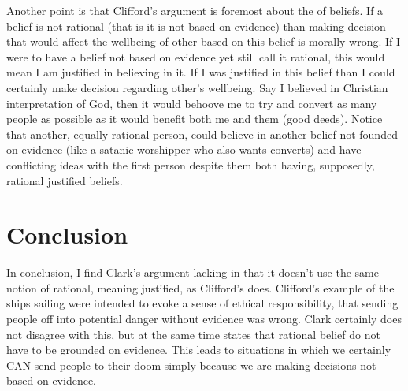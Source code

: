 \documentclass{article}
\begin{document}
Another point is that Clifford's argument is foremost about the  of beliefs. If a belief is not rational (that is it is not based on evidence) than making decision that would affect the wellbeing of other based on this belief is morally wrong. If I were to have a belief not based on evidence yet still call it rational, this would mean I am justified in believing in it. If I was justified in this belief than I could certainly make decision regarding other's wellbeing. Say I believed in Christian interpretation of God, then it would behoove me to try and convert as many people as possible as it would benefit both me and them (good deeds). Notice that another, equally rational person, could believe in another belief not founded on evidence (like a satanic worshipper who also wants converts) and have conflicting ideas with the first person despite them both having, supposedly, rational justified beliefs.


\section{Conclusion}
In conclusion, I find Clark's argument lacking in that it doesn't use the same notion of rational, meaning justified, as Clifford's does. Clifford's example of the ships sailing were intended to evoke a sense of ethical responsibility, that sending people off into potential danger without evidence was wrong. Clark certainly does not disagree with this, but at the same time states that rational belief do not have to be grounded on evidence. This leads to situations in which we certainly CAN send people to their doom simply because we are making decisions not based on evidence.
\end{document}
